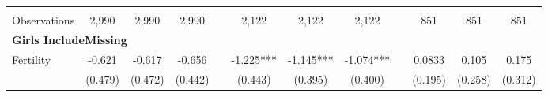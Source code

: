 \begin{landscape}
\begin{table}[htpb!]
\begin{center}
\begin{tabular}{lcccp{2mm}cccp{2mm}ccc}
\begin{footnotesize}\end{footnotesize}&\begin{footnotesize}\end{footnotesize}&\begin{footnotesize}\end{footnotesize}&\begin{footnotesize}\end{footnotesize}&\begin{footnotesize}\end{footnotesize}&\begin{footnotesize}\end{footnotesize}&\begin{footnotesize}\end{footnotesize}&\begin{footnotesize}\end{footnotesize}&\begin{footnotesize}\end{footnotesize}&\begin{footnotesize}\end{footnotesize}&\begin{footnotesize}\end{footnotesize}&\begin{footnotesize}\end{footnotesize}\\Observations&2,990&2,990&2,990&&2,122&2,122&2,122&&851&851&851\\
\multicolumn{12}{l}{\textbf{Girls IncludeMissing}}\\ 
Fertility&-0.621&-0.617&-0.656&&-1.225***&-1.145***&-1.074***&&0.0833&0.105&0.175\\
&(0.479)&(0.472)&(0.442)&&(0.443)&(0.395)&(0.400)&&(0.195)&(0.258)&(0.312)\\

\end{tabular}
\end{center}
\end{table}
\end{landscape}
